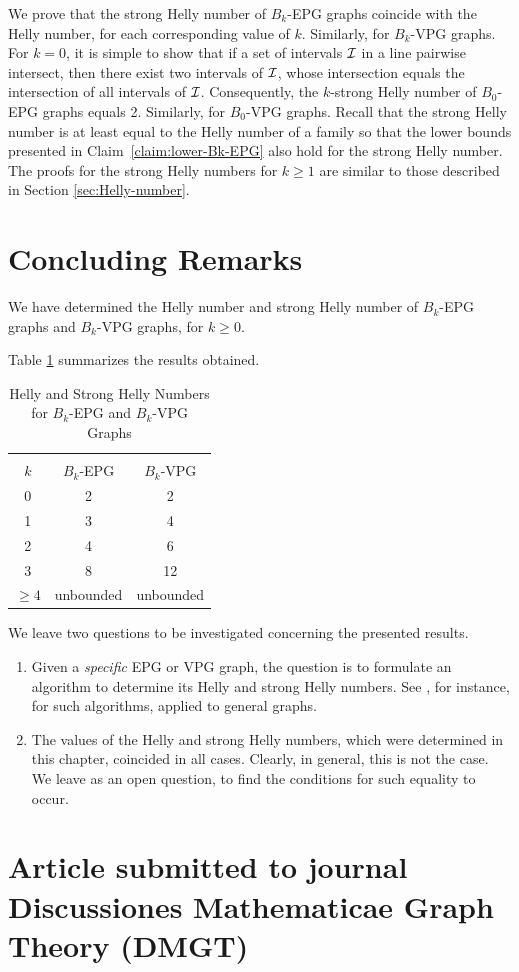 We prove that the strong Helly number of $B_k$-EPG graphs coincide with the Helly number, for each corresponding value of $k$. Similarly, for $B_k$-VPG graphs. For $k=0$, it is simple to show that if a set of intervals $\cal I$ in a line pairwise intersect, then there exist two intervals of $\cal I$, whose intersection equals the intersection of all intervals of $\cal I$. Consequently, the $k$-strong Helly number of $B_0$-EPG graphs equals 2. 
Similarly, for $B_0$-VPG graphs. 
Recall that the strong Helly number is at least equal to the Helly number of a family so that the lower bounds presented in Claim~\ref{claim:lower-Bk-EPG} also hold for the strong Helly number. The proofs for the strong Helly numbers for $k \geq 1$ are similar to those described in Section \ref{sec:Helly-number}.  



\section{Concluding Remarks}\label{sec:concludingRemarks}
We have determined the Helly number and strong Helly number of $B_k$-EPG graphs and $B_k$-VPG graphs, for $k \geq 0$. 

Table \ref{tab:Helly-Strong-Helly} summarizes the results obtained.
 
\Large 

\begin{table}[htb]
    \centering
    \caption{Helly and Strong Helly Numbers for $B_k$-EPG and $B_k$-VPG Graphs}
    \label{tab:Helly-Strong-Helly}
    \begin{tabular}{c|c|c}
     \multicolumn{3}{c}{}\\
    \cline{1-3} $k$  & $B_k$-EPG & $B_k$-VPG \\
    \cline{1-3} 0 & 2 & 2 \\
    \cline{1-3} 1 & 3 & 4 \\
    \cline{1-3} 2 & 4 & 6 \\
    \cline{1-3} 3 & 8 & 12 \\
    \cline{1-3} $\geq 4$ & unbounded & unbounded \\
    \cline{1-3} 
    \end{tabular}
\end{table}

\normalsize

We leave two questions to be investigated concerning the presented results.

\begin{enumerate}
\item Given a {\it specific}  EPG or VPG graph, the question is to formulate an algorithm to determine its Helly and strong Helly numbers. See \cite{dourado2008improved}, for instance, for such algorithms, applied to general graphs. 

\item The values of the Helly and strong Helly numbers, which were determined in this chapter, coincided in all cases. Clearly, in general, this is not the case. We leave as an open question, to find the conditions for such equality to occur. \end{enumerate}


\newpage


\section{Article submitted to journal  Discussiones Mathematicae Graph Theory (DMGT)} 
